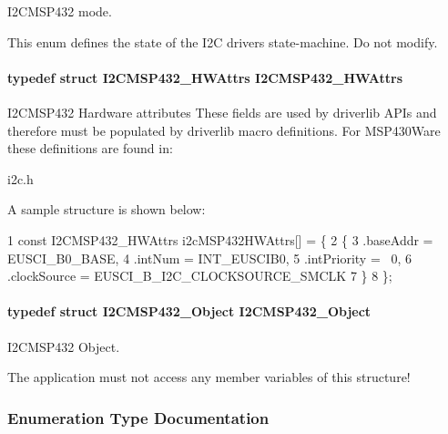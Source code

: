 I2\+C\+M\+S\+P432 mode. 

This enum defines the state of the I2\+C driver\textquotesingle{}s state-\/machine. Do not modify. 
\paragraph[{I2\+C\+M\+S\+P432\+\_\+\+H\+W\+Attrs}]{\setlength{\rightskip}{0pt plus 5cm}typedef struct {\bf I2\+C\+M\+S\+P432\+\_\+\+H\+W\+Attrs}  {\bf I2\+C\+M\+S\+P432\+\_\+\+H\+W\+Attrs}}\label{_i2_c_m_s_p432_8h_a7bf10d73c67977cd12a2d465d2412ed6}


I2\+C\+M\+S\+P432 Hardware attributes These fields are used by driverlib A\+P\+Is and therefore must be populated by driverlib macro definitions. For M\+S\+P430\+Ware these definitions are found in\+: 


\begin{DoxyItemize}
\item i2c.\+h
\end{DoxyItemize}

A sample structure is shown below\+: 
\begin{DoxyCode}
1 const I2CMSP432\_HWAttrs i2cMSP432HWAttrs[] = \{
2     \{
3         .baseAddr = EUSCI\_B0\_BASE,
4         .intNum = INT\_EUSCIB0,
5         .intPriority = ~0,
6         .clockSource = EUSCI\_B\_I2C\_CLOCKSOURCE\_SMCLK
7     \}
8 \};
\end{DoxyCode}
\paragraph[{I2\+C\+M\+S\+P432\+\_\+\+Object}]{\setlength{\rightskip}{0pt plus 5cm}typedef struct {\bf I2\+C\+M\+S\+P432\+\_\+\+Object}  {\bf I2\+C\+M\+S\+P432\+\_\+\+Object}}\label{_i2_c_m_s_p432_8h_aa3af568a4521fd6f2444f4dc62ed7c59}


I2\+C\+M\+S\+P432 Object. 

The application must not access any member variables of this structure! 

\subsubsection{Enumeration Type Documentation}
